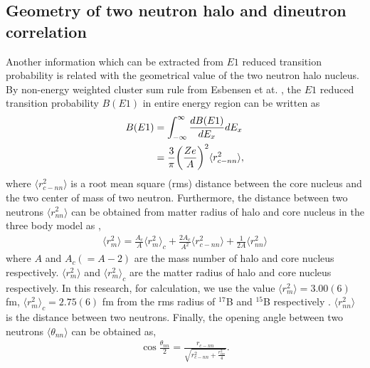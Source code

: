 \subsection{Geometry of two neutron halo and dineutron correlation}
Another information which can be extracted from $E1$ reduced transition probability is related with the geometrical value of the two neutron halo nucleus. By non-energy weighted cluster sum rule from Esbensen et at. \cite{Esbensen}, the $E1$ reduced transition probability $B(E1)$ in entire energy region can be written as 
\begin{align}
    B(E1) &= \int_{-\infty}^{\infty} \frac{dB(E1)}{dE_x}dE_x \notag \\
        &= \frac{3}{\pi} \bigg(\frac{Z e}{A}\bigg)^2 \langle r^2_{c-nn} \rangle,
\end{align}
where $\langle r^2_{c-nn} \rangle$ is a root mean square (rms) distance between the core nucleus and the two center of mass of two neutron. Furthermore, the distance between two neutrons $\langle r^2_{nn} \rangle$ can be obtained from matter radius of halo and core nucleus in the three body model as \cite{Bertulani07}\cite{Hagino07},
\begin{align}
    \langle r^2_{m} \rangle = \frac{A_c}{A} \langle r^2_{m} \rangle_{c} + \frac{2A_c}{A^2} \langle r^2_{c-nn} \rangle + \frac{1}{2A} \langle r^2_{nn} \rangle
\end{align}
where $A$ and $A_c (= A - 2)$ are the mass number of halo and core nucleus respectively. $\langle r^2_{m} \rangle$ and $\langle r^2_{m} \rangle_{c}$ are the matter radius of halo and core nucleus respectively. In this research, for calculation, we use the value $\langle r^2_{m} \rangle = 3.00 (6)$ fm, $\langle r^2_{m} \rangle_c = 2.75 (6)$ fm from the rms radius of $^{17}$B and $^{15}$B respectively \cite{Estrade}. $\langle r^2_{nn} \rangle$ is the distance between two neutrons.
Finally, the opening angle between two neutrons $\langle \theta_{nn} \rangle$ can be obtained as,
\begin{align}
    \cos \frac{\theta_{nn}}{2} = \frac{r_{c-nn}}{\sqrt{r^2_{c-nn} + \frac{r^2_{nn}}{4}} }.
\end{align}


